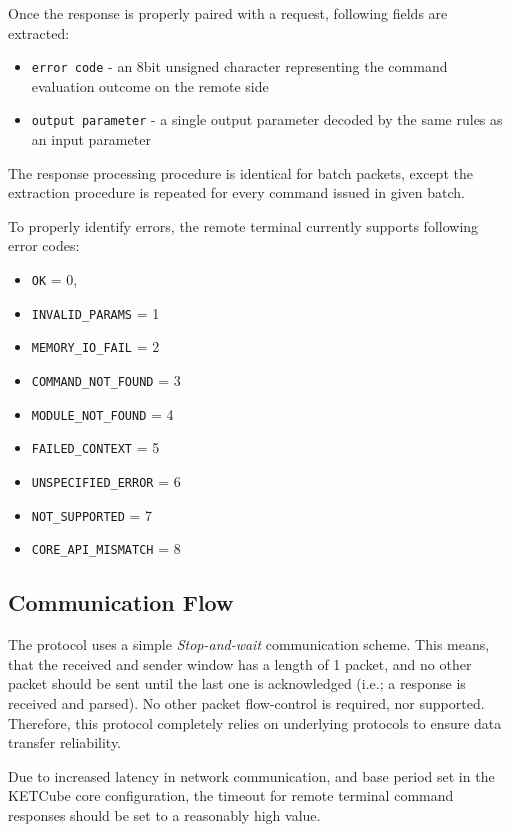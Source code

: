 Once the response is properly paired with a request, following fields are extracted:

\begin{itemize}
	\item \texttt{error code} - an 8bit unsigned character representing the command evaluation outcome on the remote side
	\item \texttt{output parameter} - a single output parameter decoded by the same rules as an input parameter
\end{itemize}

The response processing procedure is identical for batch packets, except the extraction procedure is repeated for every command issued in given batch.

To properly identify errors, the remote terminal currently supports following error codes:

\begin{itemize}
  \item \texttt{OK} = 0,
  \item \texttt{INVALID\_PARAMS} = 1
  \item \texttt{MEMORY\_IO\_FAIL} = 2
  \item \texttt{COMMAND\_NOT\_FOUND} = 3
  \item \texttt{MODULE\_NOT\_FOUND} = 4
  \item \texttt{FAILED\_CONTEXT} = 5
  \item \texttt{UNSPECIFIED\_ERROR} = 6
  \item \texttt{NOT\_SUPPORTED} = 7
  \item \texttt{CORE\_API\_MISMATCH} = 8
\end{itemize}

\subsection{Communication Flow}

The protocol uses a simple \textit{Stop-and-wait} communication scheme. This means, that the received and sender window has a length of 1 packet, and no other packet should be sent until the last one is acknowledged (i.e.; a response is received and parsed). No other packet flow-control is required, nor supported. Therefore, this protocol completely relies on underlying protocols to ensure data transfer reliability.

Due to increased latency in network communication, and base period set in the KETCube core configuration, the timeout for remote terminal command responses should be set to a reasonably high value. 

